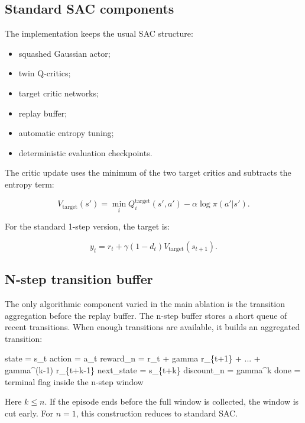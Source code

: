 \documentclass[
  american,
]{article}
\newenvironment{Shaded}{}{}
\newcommand{\NormalTok}[1]{#1}
\providecommand{\tightlist}{%
  \setlength{\itemsep}{0pt}\setlength{\parskip}{0pt}}
\begin{document}
\subsection{Standard SAC components}\label{standard-sac-components}

The implementation keeps the usual SAC structure:

\begin{itemize}
\tightlist
\item
  squashed Gaussian actor;
\item
  twin Q-critics;
\item
  target critic networks;
\item
  replay buffer;
\item
  automatic entropy tuning;
\item
  deterministic evaluation checkpoints.
\end{itemize}

The critic update uses the minimum of the two target critics and
subtracts the entropy term:

\[
V_{\text{target}}(s') =
\min_i Q_i^{\text{target}}(s', a') - \alpha \log \pi(a'|s').
\]

For the standard 1-step version, the target is:

\[
y_t = r_t + \gamma (1-d_t) V_{\text{target}}(s_{t+1}).
\]

\subsection{N-step transition buffer}\label{n-step-transition-buffer}

The only algorithmic component varied in the main ablation is the
transition aggregation before the replay buffer. The n-step buffer
stores a short queue of recent transitions. When enough transitions are
available, it builds an aggregated transition:

\begin{Shaded}
\begin{Highlighting}[]
\NormalTok{state      = s\_t}
\NormalTok{action     = a\_t}
\NormalTok{reward\_n   = r\_t + gamma r\_\{t+1\} + ... + gamma\^{}(k{-}1) r\_\{t+k{-}1\}}
\NormalTok{next\_state = s\_\{t+k\}}
\NormalTok{discount\_n = gamma\^{}k}
\NormalTok{done       = terminal flag inside the n{-}step window}
\end{Highlighting}
\end{Shaded}

Here \(k \leq n\). If the episode ends before the full window is
collected, the window is cut early. For \(n=1\), this construction
reduces to standard SAC.
\end{document}
